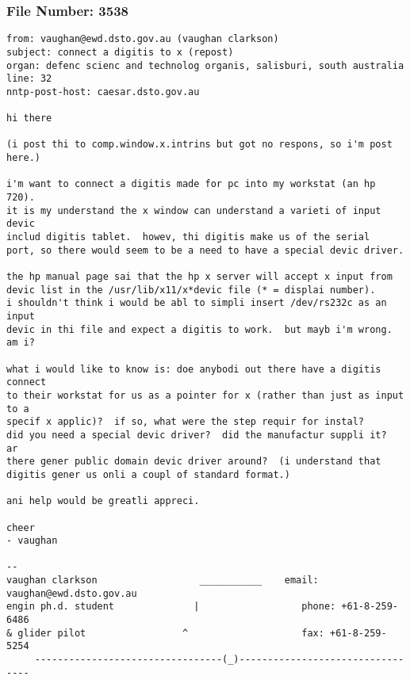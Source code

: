 \subsubsection*{File Number: 3538}
\scriptsize\begin{verbatim}
from: vaughan@ewd.dsto.gov.au (vaughan clarkson)
subject: connect a digitis to x (repost)
organ: defenc scienc and technolog organis, salisburi, south australia
line: 32
nntp-post-host: caesar.dsto.gov.au

hi there

(i post thi to comp.window.x.intrins but got no respons, so i'm post
here.)

i'm want to connect a digitis made for pc into my workstat (an hp 720).
it is my understand the x window can understand a varieti of input devic
includ digitis tablet.  howev, thi digitis make us of the serial
port, so there would seem to be a need to have a special devic driver.

the hp manual page sai that the hp x server will accept x input from
devic list in the /usr/lib/x11/x*devic file (* = displai number).
i shouldn't think i would be abl to simpli insert /dev/rs232c as an input
devic in thi file and expect a digitis to work.  but mayb i'm wrong.  am i?

what i would like to know is: doe anybodi out there have a digitis connect
to their workstat for us as a pointer for x (rather than just as input to a
specif x applic)?  if so, what were the step requir for instal?
did you need a special devic driver?  did the manufactur suppli it?  ar
there gener public domain devic driver around?  (i understand that
digitis gener us onli a coupl of standard format.)

ani help would be greatli appreci.

cheer
- vaughan

-- 
vaughan clarkson                  ___________    email: vaughan@ewd.dsto.gov.au
engin ph.d. student              |                  phone: +61-8-259-6486
& glider pilot			       ^                    fax: +61-8-259-5254
     ---------------------------------(_)---------------------------------
\end{verbatim}
